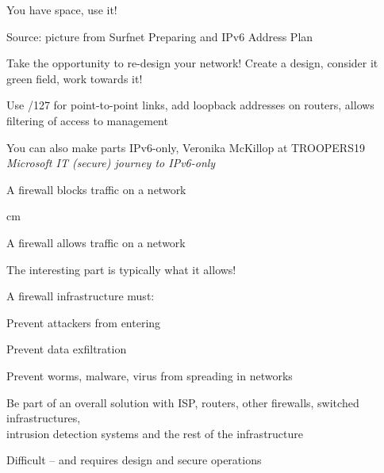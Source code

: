 \documentclass[Screen16to9,17pt]{foils}
\begin{document}
\begin{list2}
\item You have space, use it!
\end{list2}



Source: picture from Surfnet Preparing and IPv6 Address Plan

\begin{list2}
\item Take the opportunity to re-design your network! Create a design, consider it green field, work towards it!
\item Use /127 for point-to-point links, add loopback addresses on routers, allows filtering of access to management
\item You can also make parts IPv6-only, Veronika McKillop at TROOPERS19 \emph{Microsoft IT (secure) journey to IPv6-only}\\
\end{list2}





\centerline{\hlkbig A firewall {\color{security6blue}blocks traffic} on a network}

 cm
\pause

\centerline{\hlkbig A firewall {\color{red}allows traffic} on a network}
{\small The interesting part is typically what it allows!}

\begin{list1}
\item A firewall infrastructure must:
\begin{list2}
\item Prevent attackers from entering
\item Prevent data exfiltration
\item Prevent worms, malware, virus from spreading in networks
\item Be part of an overall solution with ISP, routers, other firewalls, switched infrastructures,\\
  intrusion detection systems and the rest of the infrastructure
\end{list2}
\end{list1}

\vskip 5mm
\centerline{Difficult -- and requires design and secure operations}
\end{document}

